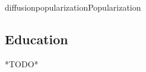 \documentclass{ra2018}
\begin{document}
\begin{module}{diffusion}{popularization}{Popularization}
\subsection{Education}

*TODO*


\end{module}
\end{document}
